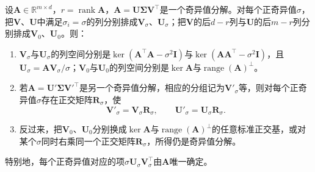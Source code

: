 \begin{theorem}[奇异值分解的唯一性范围]
\label{thm:svd-uniqueness}
设$\bm A\in\mathbb R^{m\times d}$，$r=\operatorname{rank}\bm A$，$\bm A=\bm U\bm\Sigma\bm V^\top$是一个奇异值分解。对每个正奇异值$\sigma$，把$\bm V$、$\bm U$中满足$\sigma_i=\sigma$的列分别排成$\bm V_\sigma$、$\bm U_\sigma$；把$\bm V$的后$d-r$列与$\bm U$的后$m-r$列分别排成$\bm V_0$、$\bm U_0$。则：
\begin{enumerate}
 \item $\bm V_\sigma$与$\bm U_\sigma$的列空间分别是$\ker(\bm A^\top\bm A-\sigma^2\bm I)$与$\ker(\bm A\bm A^\top-\sigma^2\bm I)$，且$\bm U_\sigma=\bm A\bm V_\sigma/\sigma$；$\bm V_0$与$\bm U_0$的列空间分别是$\ker\bm A$与$\operatorname{range}(\bm A)^\perp$。
 \item 若$\bm A=\bm U'\bm\Sigma\bm V'^\top$是另一个奇异值分解，相应的分组记为$\bm V'_\sigma$等，则对每个正奇异值$\sigma$存在正交矩阵$\bm R_\sigma$，使
 \[
  \bm V'_\sigma=\bm V_\sigma\bm R_\sigma,\qquad\bm U'_\sigma=\bm U_\sigma\bm R_\sigma .
 \]
 \item 反过来，把$\bm V_0$、$\bm U_0$分别换成$\ker\bm A$与$\operatorname{range}(\bm A)^\perp$的任意标准正交基，或对某个$\sigma$同时右乘同一个正交矩阵$\bm R_\sigma$，所得仍是奇异值分解。
\end{enumerate}
特别地，每个正奇异值对应的项$\sigma\bm U_\sigma\bm V_\sigma^\top$由$\bm A$唯一确定。
\end{theorem}
